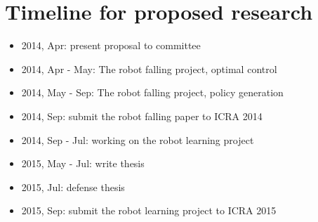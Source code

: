 \chapter{Timeline for proposed research}

\begin{itemize}
  \item 2014, Apr: present proposal to committee
  \item 2014, Apr - May: The robot falling project, optimal control
  \item 2014, May - Sep: The robot falling project, policy generation
  \item 2014, Sep: submit the robot falling paper to ICRA 2014
  \item 2014, Sep - Jul: working on the robot learning project
  \item 2015, May - Jul: write thesis
  \item 2015, Jul: defense thesis
  \item 2015, Sep: submit the robot learning project to ICRA 2015
\end{itemize}
